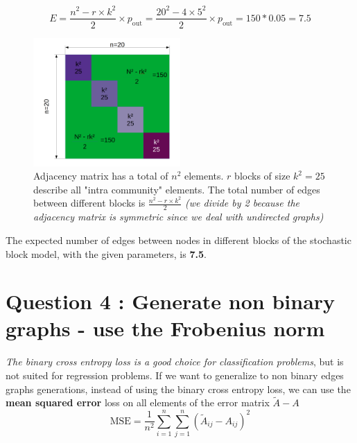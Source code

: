 \documentclass[a4paper]{article}
\begin{document}
$$ E = \frac{n^2 - r \times k^2}{2} \times p_{\text{out}} = \frac{20^2 - 4 \times 5^2}{2}\times p_{\text{out}}=150*0.05=7.5$$

\begin{figure}[H]
    \centering
    \includegraphics[width=0.5\textwidth]{figures/SBM_computation.png}
    \caption{Adjacency matrix has a total of $n^2$ elements. \color{purple}$r$ blocks of size $k^2 = 25$ describe all "intra community" elements. \color{black} The total number of edges between different blocks is \color{green}$\frac{n^2 - r \times k^2}{2}$ \color{black}\textit{(we divide by 2 because the adjacency matrix is symmetric since we deal with undirected graphs)}
    }
    \label{fig:number_of_edges_different_blocks}
\end{figure}

The expected number of edges between nodes in different blocks of the stochastic block model, with the given parameters, is \textbf{7.5}.



\section*{Question 4 : Generate non binary graphs - use the Frobenius norm}
\textit{The binary cross entropy loss is a good choice for classification problems}, but is not suited for regression problems.
If we want to generalize to non binary edges graphs generations, instead of using the binary cross entropy loss, we can use the \textbf{mean squared error} loss on all elements of the error matrix $\tilde{A}-A$ 
$$\text{MSE} = \frac{1}{n^2} \sum_{i=1}^n \sum_{j=1}^n (\tilde{A}_{ij} - A_{ij})^2$$


\end{document}
